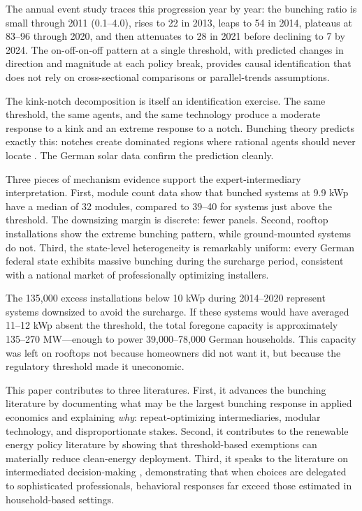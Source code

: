 \documentclass[12pt]{article}
\begin{document}
The annual event study traces this progression year by year: the bunching ratio is small through 2011 (0.1--4.0), rises to 22 in 2013, leaps to 54 in 2014, plateaus at 83--96 through 2020, and then attenuates to 28 in 2021 before declining to 7 by 2024. The on-off-on-off pattern at a single threshold, with predicted changes in direction and magnitude at each policy break, provides causal identification that does not rely on cross-sectional comparisons or parallel-trends assumptions.

The kink-notch decomposition is itself an identification exercise. The same threshold, the same agents, and the same technology produce a moderate response to a kink and an extreme response to a notch. Bunching theory predicts exactly this: notches create dominated regions where rational agents should never locate \citep{kleven2016bunching}. The German solar data confirm the prediction cleanly.

Three pieces of mechanism evidence support the expert-intermediary interpretation. First, module count data show that bunched systems at 9.9 kWp have a median of 32 modules, compared to 39--40 for systems just above the threshold. The downsizing margin is discrete: fewer panels. Second, rooftop installations show the extreme bunching pattern, while ground-mounted systems do not. Third, the state-level heterogeneity is remarkably uniform: every German federal state exhibits massive bunching during the surcharge period, consistent with a national market of professionally optimizing installers.

The 135,000 excess installations below 10 kWp during 2014--2020 represent systems downsized to avoid the surcharge. If these systems would have averaged 11--12 kWp absent the threshold, the total foregone capacity is approximately 135--270 MW---enough to power 39,000--78,000 German households. This capacity was left on rooftops not because homeowners did not want it, but because the regulatory threshold made it uneconomic.

This paper contributes to three literatures. First, it advances the bunching literature \citep{saez2010taxpayers, kleven2013using} by documenting what may be the largest bunching response in applied economics and explaining \textit{why}: repeat-optimizing intermediaries, modular technology, and disproportionate stakes. Second, it contributes to the renewable energy policy literature \citep{borenstein2012private, hughes2015policy} by showing that threshold-based exemptions can materially reduce clean-energy deployment. Third, it speaks to the literature on intermediated decision-making \citep{chetty2011adjustment}, demonstrating that when choices are delegated to sophisticated professionals, behavioral responses far exceed those estimated in household-based settings.
\end{document}
